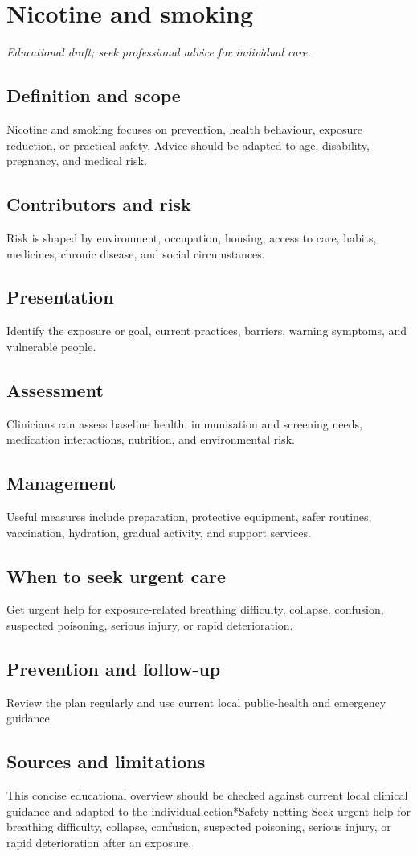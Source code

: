 \chapter{Nicotine and smoking}

\medskip
\noindent\textit{Educational draft; seek professional advice for individual care.}

\section*{Definition and scope}
Nicotine and smoking focuses on prevention, health behaviour, exposure reduction, or practical safety. Advice should be adapted to age, disability, pregnancy, and medical risk.

\section*{Contributors and risk}
Risk is shaped by environment, occupation, housing, access to care, habits, medicines, chronic disease, and social circumstances.

\section*{Presentation}
Identify the exposure or goal, current practices, barriers, warning symptoms, and vulnerable people.

\section*{Assessment}
Clinicians can assess baseline health, immunisation and screening needs, medication interactions, nutrition, and environmental risk.

\section*{Management}
Useful measures include preparation, protective equipment, safer routines, vaccination, hydration, gradual activity, and support services.

\section*{When to seek urgent care}
Get urgent help for exposure-related breathing difficulty, collapse, confusion, suspected poisoning, serious injury, or rapid deterioration.

\section*{Prevention and follow-up}
Review the plan regularly and use current local public-health and emergency guidance.

\section*{Sources and limitations}
This concise educational overview should be checked against current local clinical guidance and adapted to the individual.ection*{Safety-netting}
Seek urgent help for breathing difficulty, collapse, confusion, suspected poisoning, serious injury, or rapid deterioration after an exposure.
